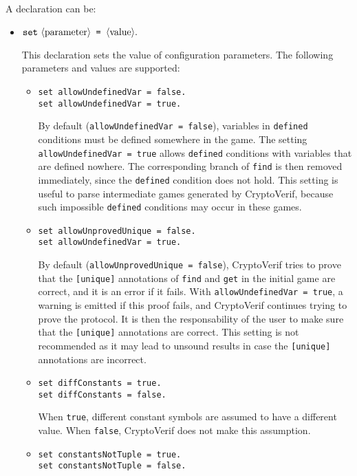 A declaration can be:
\begin{itemize}

\item ${\tt set\ } \langle\textrm{parameter}\rangle \texttt{ = } \langle\textrm{value}\rangle{\tt .}$

This declaration sets the value of configuration parameters.
The following parameters and values are supported:

\begin{itemize}

\item \texttt{set allowUndefinedVar = false.}\\
\texttt{set allowUndefinedVar = true.}

By default (\texttt{allowUndefinedVar = false}), variables in
\texttt{defined} conditions must be defined somewhere in the game.
The setting \texttt{allowUndefinedVar = true} allows
\texttt{defined} conditions with variables that are defined
nowhere. The corresponding branch of \texttt{find} is then
removed immediately, since the \texttt{defined} condition does not hold.
This setting is useful to parse intermediate games generated by
CryptoVerif, because such impossible \texttt{defined} conditions
may occur in these games.

\item \texttt{set allowUnprovedUnique = false.}\\
\texttt{set allowUndefinedVar = true.}

By default (\texttt{allowUnprovedUnique = false}), CryptoVerif tries to
prove that the \texttt{[unique]} annotations of \texttt{find} and \texttt{get}
in the initial game are correct, and it is an error if it fails.
With \texttt{allowUndefinedVar = true}, a warning is emitted if this proof
fails, and CryptoVerif continues trying to prove the protocol. It is then
the responsability of the user to make sure that the \texttt{[unique]} annotations
are correct. This setting is not recommended as it may lead to unsound
results in case the \texttt{[unique]} annotations are incorrect.

\item \texttt{set diffConstants = true.}\\
\texttt{set diffConstants = false.}

When {\tt true}, different constant symbols are assumed to have a
different value. When {\tt false}, CryptoVerif does not make this
assumption.

\item \texttt{set constantsNotTuple = true.}\\
\texttt{set constantsNotTuple = false.}


\end{itemize}
\end{itemize}
